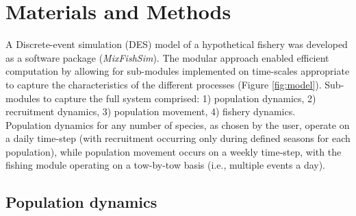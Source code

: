\documentclass[preprint]{elsarticle}
\begin{document}
\section{Materials and Methods}

A Discrete-event simulation (DES) model of a hypothetical fishery was developed
as a software package (\textit{MixFishSim}). The modular approach enabled
efficient computation by allowing for sub-modules implemented on time-scales
appropriate to capture the characteristics of the different processes (Figure
\ref{fig:model}). Sub-modules to capture the full system comprised: 1) population
dynamics, 2) recruitment dynamics, 3) population movement, 4) fishery
dynamics.\\

Population dynamics for any number of species, as chosen by the user, operate
on a daily time-step (with recruitment occurring only during defined seasons
for each population), while population movement occurs on a weekly time-step,
with the fishing module operating on a tow-by-tow basis (i.e., multiple events
a day). \\

\subsection{Population dynamics}
\end{document}
